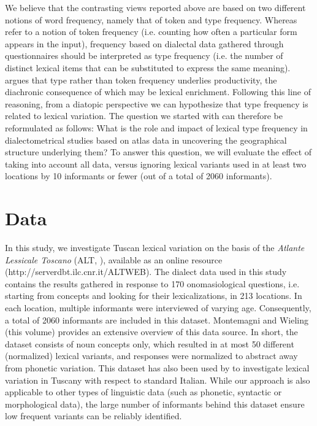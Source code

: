\documentclass[output=paper]{LSP/langsci}
\begin{document}
We believe that the contrasting views reported above are based on two different notions of word frequency, namely that of token and type frequency. Whereas \citet{manning_foundations_1999} refer to a notion of token frequency (i.e. counting how often a particular form appears in the input), frequency based on dialectal data gathered through questionnaires should be interpreted as type frequency (i.e.  the number of distinct lexical items that can be substituted to express the same meaning). \citet{bybee_phonology_2001} argues that type rather than token frequency underlies productivity, the diachronic consequence of which may be lexical enrichment. Following this line of reasoning, from a diatopic perspective we can hypothesize that type frequency is related  to lexical variation. The question we started with can therefore be reformulated as follows: What is the role and impact of lexical type frequency in dialectometrical studies based on atlas data in uncovering the geographical structure underlying them? To answer this question, we will evaluate the effect of taking into account all data, versus ignoring lexical variants used in at least two locations by 10 informants or fewer (out of a total of 2060 informants).

\section{Data}
In this study, we investigate Tuscan lexical variation on the basis of the \textit{Atlante Lessicale Toscano} (ALT, \citealt{giacomelli_atlante_2000}), available as an online resource (http://serverdbt.ilc.cnr.it/ALTWEB). The dialect data used in this study contains the results gathered in response to 170 onomasiological questions, i.e. starting from concepts and looking for their lexicalizations, in 213 locations. In each location, multiple informants were interviewed of varying age. Consequently, a total of 2060 informants are included in this dataset. Montemagni and Wieling (this volume) provides an extensive overview of this data source. In short, the dataset consists of noun concepts only, which resulted in at most 50 different (normalized) lexical variants, and responses were normalized to abstract away from phonetic variation. This dataset has also been used by \citet{wieling_lexical_2014} to investigate lexical variation in Tuscany with respect to standard Italian. While our approach is also applicable to other types of linguistic data (such as phonetic, syntactic or morphological data), the large number of informants behind this dataset ensure low frequent variants can be reliably identified.
\end{document}
